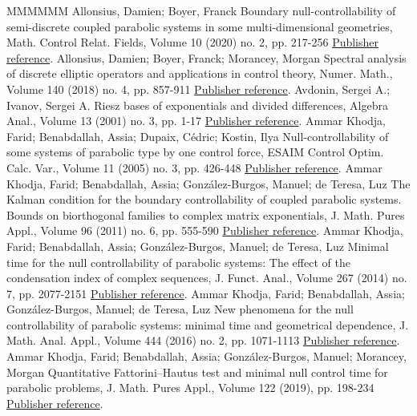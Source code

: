 \documentclass[11pt]{article}
\theoremstyle{definition}
\numberwithin{equation}{section}
\numberwithin{figure}{section}
\numberwithin{table}{section}
\begin{document}
\begin{thebibliography}{MMMMMM}
 Allonsius, Damien; Boyer, Franck Boundary null-controllability of semi-discrete coupled parabolic systems in some multi-dimensional geometries, Math. Control Relat. Fields, Volume 10 (2020) no. 2, pp. 217-256 \href{https://ahl.centre-mersenne.org/item/AHL_2020__3__717_0/#AB18}{Publisher reference}.
 Allonsius, Damien; Boyer, Franck; Morancey, Morgan Spectral analysis of discrete elliptic operators and applications in control theory, Numer. Math., Volume 140 (2018) no. 4, pp. 857-911 \href{https://ahl.centre-mersenne.org/item/AHL_2020__3__717_0/#ABM_2018}{Publisher reference}.
 Avdonin, Sergei A.; Ivanov, Sergei A. Riesz bases of exponentials and divided differences, Algebra Anal., Volume 13 (2001) no. 3, pp. 1-17 \href{https://ahl.centre-mersenne.org/item/AHL_2020__3__717_0/#AvdoninIvanov01}{Publisher reference}.
 Ammar Khodja, Farid; Benabdallah, Assia; Dupaix, Cédric; Kostin, Ilya Null-controllability of some systems of parabolic type by one control force, ESAIM Control Optim. Calc. Var., Volume 11 (2005) no. 3, pp. 426-448 \href{https://ahl.centre-mersenne.org/item/AHL_2020__3__717_0/#AKBDK05}{Publisher reference}.
 Ammar Khodja, Farid; Benabdallah, Assia; González-Burgos, Manuel; de Teresa, Luz The Kalman condition for the boundary controllability of coupled parabolic systems. Bounds on biorthogonal families to complex matrix exponentials, J. Math. Pures Appl., Volume 96 (2011) no. 6, pp. 555-590 \href{https://ahl.centre-mersenne.org/item/AHL_2020__3__717_0/#AKBGBDT_Kalman}{Publisher reference}.
 Ammar Khodja, Farid; Benabdallah, Assia; González-Burgos, Manuel; de Teresa, Luz Minimal time for the null controllability of parabolic systems: The effect of the condensation index of complex sequences, J. Funct. Anal., Volume 267 (2014) no. 7, pp. 2077-2151 \href{https://ahl.centre-mersenne.org/item/AHL_2020__3__717_0/#AmmarKhodjaBenabdallahGonzalez-BurgosdeTeresa:2014}{Publisher reference}.
 Ammar Khodja, Farid; Benabdallah, Assia; González-Burgos, Manuel; de Teresa, Luz New phenomena for the null controllability of parabolic systems: minimal time and geometrical dependence, J. Math. Anal. Appl., Volume 444 (2016) no. 2, pp. 1071-1113 \href{https://ahl.centre-mersenne.org/item/AHL_2020__3__717_0/#AKBGBdT_JMAA16}{Publisher reference}.
 Ammar Khodja, Farid; Benabdallah, Assia; González-Burgos, Manuel; Morancey, Morgan Quantitative Fattorini–Hautus test and minimal null control time for parabolic problems, J. Math. Pures Appl., Volume 122 (2019), pp. 198-234 \href{https://ahl.centre-mersenne.org/item/AHL_2020__3__717_0/#AKBGBM_2018}{Publisher reference}.

\end{thebibliography}
\end{document}
